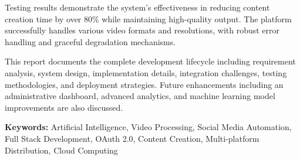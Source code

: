 \vspace{0.5cm}

Testing results demonstrate the system's effectiveness in reducing content creation time by over 80\% while maintaining high-quality output. The platform successfully handles various video formats and resolutions, with robust error handling and graceful degradation mechanisms.

\vspace{0.5cm}

This report documents the complete development lifecycle including requirement analysis, system design, implementation details, integration challenges, testing methodologies, and deployment strategies. Future enhancements including an administrative dashboard, advanced analytics, and machine learning model improvements are also discussed.

\vspace{0.5cm}

\textbf{Keywords:} Artificial Intelligence, Video Processing, Social Media Automation, Full Stack Development, OAuth 2.0, Content Creation, Multi-platform Distribution, Cloud Computing

